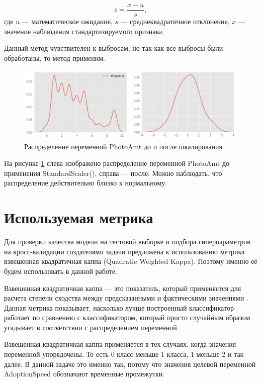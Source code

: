 \documentclass[14pt]{mmcs_article}
\begin{document}
\begin{equation}\label{eq:1}
	z = \frac{x-u}{s},
\end{equation}
где $u$ --- математическое ожидание, $s$ --- среднеквадратичное отклонение, $x$ --- значение наблюдения стандартизируемого признака.

Данный метод чувствителен к выбросам, но так как все выбросы были обработаны, то метод применим.

\begin{figure}[H]
	\centering
	\includegraphics[scale=0.4]{photoamt.png}
	\caption{Распределение переменной PhotoAmt до и после шкалирования}\label{analyse:photoamt}
\end{figure}

На рисунке \ref{analyse:photoamt} слева изображено распределение переменной PhotoAmt до применения StandardScaler(), справа --- после. Можно наблюдать, что распределение действительно близко к нормальному.

\newpage
\section{Используемая метрика}

Для проверки качества модели на тестовой выборке и подбора гиперпараметров на кросс-валидации создателями задачи предложена к использованию метрика взвешенная квадратичная каппа (Quadratic Weighted Kappa). Поэтому именно её будем использовать в данной работе. 

Взвешенная квадратичная каппа --- это показатель, который применяется для расчета степени сходства между предсказанными и фактическими значениями \cite{lib:kappa1}. Данная метрика показывает, насколько лучше построенный классификатор работает по сравнению с классификатором, который просто случайным образом угадывает в соответствии с распределением переменной.

Взвешенная квадратичная каппа применяется в тех случаях, когда значения переменной упорядочены. То есть 0 класс меньше 1 класса, 1 меньше 2 и так далее. В данной задаче это именно так, потому что значения целевой переменной AdoptionSpeed обозначают временные промежутки. 
\end{document}
